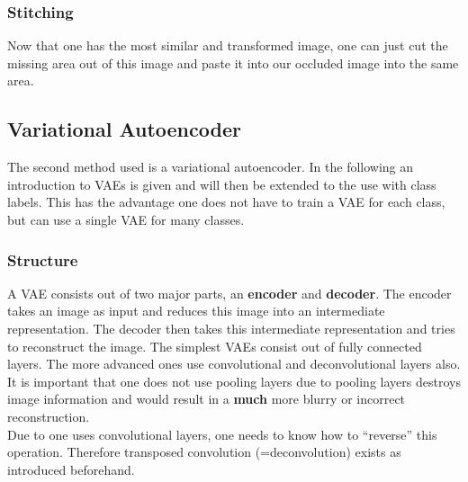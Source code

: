 \documentclass[
     11pt,         %
     a4paper,      %
     oneside,
     ]{article}
\begin{document}
\subsubsection{Stitching}
Now that one has the most similar and transformed image, one can just cut the missing area out of this image and paste it into our occluded image into the same area.

\subsection{Variational Autoencoder}
The second method used is a variational autoencoder. In the following an introduction to VAEs is given and will then be extended to the use with class labels. This has the advantage one does not have to train a VAE for each class, but can use a single VAE for many classes.
\subsubsection{Structure}
A VAE consists out of two major parts, an \textbf{encoder} and \textbf{decoder}. The encoder takes an image as input and reduces this image into an intermediate representation. The decoder then takes this intermediate representation and tries to reconstruct the image. The simplest VAEs consist out of fully connected layers. The more advanced ones use convolutional and deconvolutional layers also. It is important that one does not use pooling layers due to pooling layers destroys image information and would result in a \textbf{much} more blurry or incorrect reconstruction. \\
Due to one uses convolutional layers, one needs to know how to \enquote{reverse} this operation. Therefore transposed convolution (=deconvolution) exists as introduced beforehand.
\end{document}
